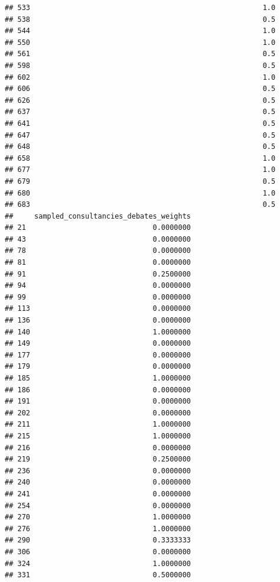 \documentclass[
]{article}
\begin{document}
\begin{verbatim}
## 533                                                       1.0
## 538                                                       0.5
## 544                                                       1.0
## 550                                                       1.0
## 561                                                       0.5
## 598                                                       0.5
## 602                                                       1.0
## 606                                                       0.5
## 626                                                       0.5
## 637                                                       0.5
## 641                                                       0.5
## 647                                                       0.5
## 648                                                       0.5
## 658                                                       1.0
## 677                                                       1.0
## 679                                                       0.5
## 680                                                       1.0
## 683                                                       0.5
##     sampled_consultancies_debates_weights
## 21                              0.0000000
## 43                              0.0000000
## 78                              0.0000000
## 81                              0.0000000
## 91                              0.2500000
## 94                              0.0000000
## 99                              0.0000000
## 113                             0.0000000
## 136                             0.0000000
## 140                             1.0000000
## 149                             0.0000000
## 177                             0.0000000
## 179                             0.0000000
## 185                             1.0000000
## 186                             0.0000000
## 191                             0.0000000
## 202                             0.0000000
## 211                             1.0000000
## 215                             1.0000000
## 216                             0.0000000
## 219                             0.2500000
## 236                             0.0000000
## 240                             0.0000000
## 241                             0.0000000
## 254                             0.0000000
## 270                             1.0000000
## 276                             1.0000000
## 290                             0.3333333
## 306                             0.0000000
## 324                             1.0000000
## 331                             0.5000000

\end{verbatim}
\end{document}
